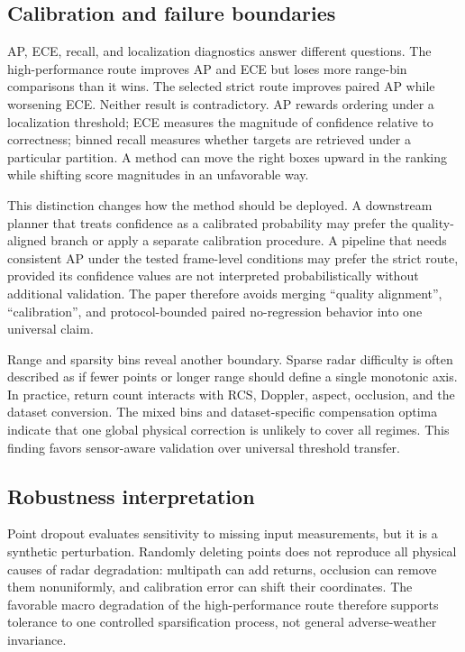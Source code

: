 \documentclass[preprint,12pt,times]{elsarticle}
\begin{document}
\subsection{Calibration and failure boundaries}

AP, ECE, recall, and localization diagnostics answer different questions. The
high-performance route improves AP and ECE but loses more range-bin comparisons
than it wins. The selected strict route improves paired AP while worsening ECE. Neither
result is contradictory. AP rewards ordering under a localization threshold;
ECE measures the magnitude of confidence relative to correctness; binned
recall measures whether targets are retrieved under a particular partition.
A method can move the right boxes upward in the ranking while shifting score
magnitudes in an unfavorable way.

This distinction changes how the method should be deployed. A downstream
planner that treats confidence as a calibrated probability may prefer the
quality-aligned branch or apply a separate calibration procedure. A pipeline
that needs consistent AP under the tested frame-level conditions may prefer the strict route,
provided its confidence values are not interpreted probabilistically without
additional validation. The paper therefore avoids merging ``quality
alignment'', ``calibration'', and protocol-bounded paired no-regression
behavior into one universal claim.

Range and sparsity bins reveal another boundary. Sparse radar difficulty is
often described as if fewer points or longer range should define a single
monotonic axis. In practice, return count interacts with RCS, Doppler, aspect,
occlusion, and the dataset conversion. The mixed bins and dataset-specific
compensation optima indicate that one global physical correction is unlikely
to cover all regimes. This finding favors sensor-aware validation over
universal threshold transfer.

\subsection{Robustness interpretation}

Point dropout evaluates sensitivity to missing input measurements, but it is a
synthetic perturbation. Randomly deleting points does not reproduce all
physical causes of radar degradation: multipath can add returns, occlusion can
remove them nonuniformly, and calibration error can shift their coordinates.
The favorable macro degradation of the high-performance route therefore
supports tolerance to one controlled sparsification process, not general
adverse-weather invariance.
\end{document}
